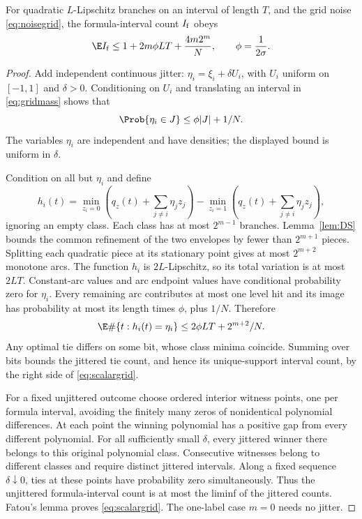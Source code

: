 \begin{theorem}\label{thm:scalargrid}
For quadratic $L$-Lipschitz branches on an interval of length $T$, and the
grid noise \eqref{eq:noisegrid}, the formula-interval count $I_{\rm f}$ obeys
\begin{equation}\label{eq:scalargrid}
 \E I_{\rm f}\le1+2m\phi LT+\frac{4m2^m}{N},
 \qquad \phi=\frac1{2\sigma}.
\end{equation}
\end{theorem}
\begin{proof}
Add independent continuous jitter: $\eta_i=\xi_i+\delta U_i$, with
$U_i$ uniform on $[-1,1]$ and $\delta>0$. Conditioning on $U_i$ and
translating an interval in \eqref{eq:gridmass} shows that
\[
 \Prob\{\eta_i\in J\}\le\phi|J|+1/N.
\]
The variables $\eta_i$ are independent and have densities; the displayed
bound is uniform in $\delta$.

Condition on all but $\eta_i$ and define
\[
 h_i(t)=\min_{z_i=0}\left(q_z(t)+\sum_{j\ne i}\eta_jz_j\right)
       -\min_{z_i=1}\left(q_z(t)+\sum_{j\ne i}\eta_jz_j\right),
\]
ignoring an empty class. Each class has at most $2^{m-1}$ branches.
Lemma~\ref{lem:DS} bounds the common refinement of the two envelopes by
fewer than $2^{m+1}$ pieces. Splitting each quadratic piece at its stationary
point gives at most $2^{m+2}$ monotone arcs. The function $h_i$ is
$2L$-Lipschitz, so its total variation is at most $2LT$. Constant-arc
values and arc endpoint values have conditional probability zero for
$\eta_i$. Every remaining arc contributes at most one level hit and its
image has probability at most its length times $\phi$, plus $1/N$.
Therefore
\[
 \E\#\{t:h_i(t)=\eta_i\}\le2\phi LT+2^{m+2}/N.
\]
Any optimal tie differs on some bit, whose class minima coincide. Summing
over bits bounds the jittered tie count, and hence its unique-support
interval count, by the right side of \eqref{eq:scalargrid}.

For a fixed unjittered outcome choose ordered interior witness points, one
per formula interval, avoiding the finitely many zeros of nonidentical
polynomial differences. At each point the winning polynomial has a positive
gap from every different polynomial. For all sufficiently small $\delta$,
every jittered winner there belongs to this original polynomial class.
Consecutive witnesses belong to different classes and require distinct
jittered intervals. Along a fixed sequence $\delta\downarrow0$, ties at
these points have probability zero simultaneously. Thus the unjittered
formula-interval count is at most the liminf of the jittered counts.
Fatou's lemma proves \eqref{eq:scalargrid}. The one-label case $m=0$
needs no jitter.
\end{proof}


